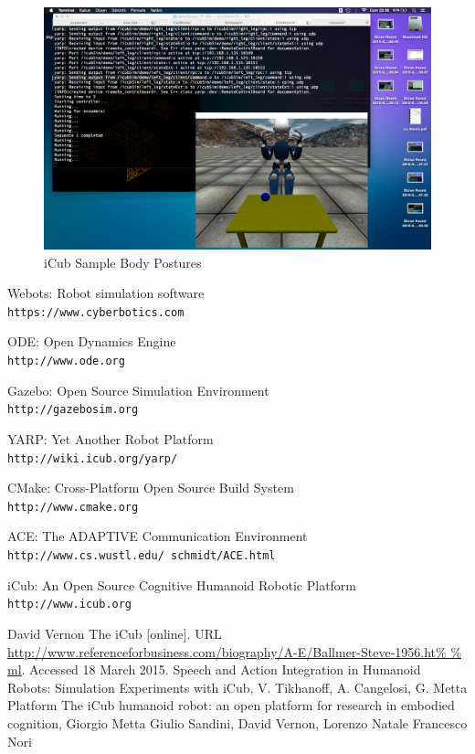 \documentclass[a4paper, 11pt]{report}
\begin{document}
\begin{figure}[h!]
\centering
\includegraphics[width=1.0\linewidth]{neural}
\caption{iCub Sample Body Postures}
\label{fig:neural}
\end{figure}


\begin{thebibliography}{9}
  Webots: Robot simulation software
  \\\texttt{https://www.cyberbotics.com}
  
  ODE: Open Dynamics Engine
  \\\texttt{http://www.ode.org}
  
  Gazebo: Open Source Simulation Environment
  \\\texttt{http://gazebosim.org}
  
  YARP: Yet Another Robot Platform 
  \\\texttt{http://wiki.icub.org/yarp/}
  
  CMake: Cross-Platform Open Source Build System 
  \\\texttt{http://www.cmake.org}
  
  ACE: The ADAPTIVE Communication Environment
  \\\texttt{http://www.cs.wustl.edu/~schmidt/ACE.html}
  
  iCub: An Open Source Cognitive Humanoid Robotic Platform
  \\\texttt{http://www.icub.org}
  
   David Vernon The iCub [online]. 
  URL 
  \url{http://www.referenceforbusiness.com/biography/A-E/Ballmer-Steve-1956.ht%
   Speech and Action Integration in Humanoid Robots: Simulation Experiments 
   with iCub, V. Tikhanoff, A. Cangelosi, G. Metta Platform 
  \bibitem{}The iCub humanoid robot: an open platform for research in embodied 
  cognition, Giorgio Metta Giulio Sandini, David Vernon, Lorenzo Natale
Francesco Nori
  \end{thebibliography}
  
\end{document}
